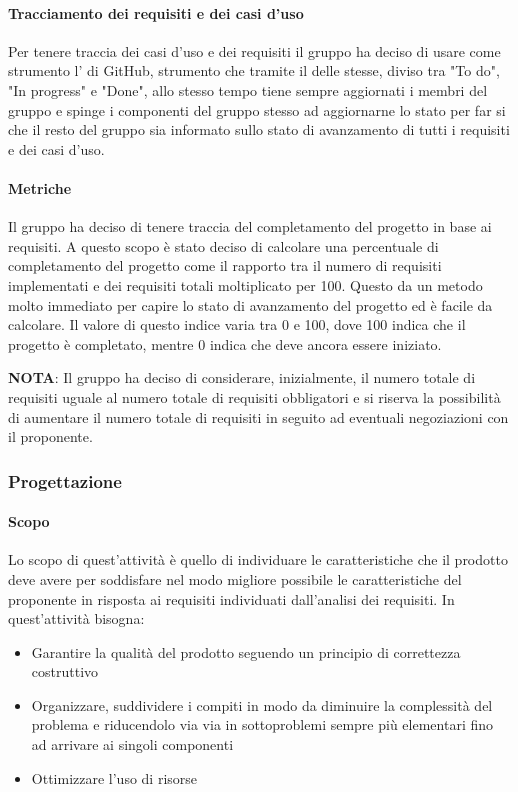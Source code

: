 \documentclass[../norme_di_progetto.tex]{subfiles}
\begin{document}
\paragraph{Tracciamento dei requisiti e dei casi d'uso}
Per tenere traccia dei casi d'uso e dei requisiti il gruppo ha deciso di usare come strumento l' di GitHub, strumento che tramite il  delle  stesse, diviso tra "To do", "In progress" e "Done", allo stesso tempo tiene sempre aggiornati i membri del gruppo e spinge i componenti del gruppo stesso ad aggiornarne lo stato per far si che il resto del gruppo sia informato sullo stato di avanzamento di tutti i requisiti e dei casi d'uso.

\paragraph{Metriche}
 Il gruppo ha deciso di tenere traccia del completamento del progetto in base ai requisiti. A questo scopo è stato deciso di calcolare una percentuale di completamento del progetto come il rapporto tra il numero di requisiti implementati e dei requisiti totali moltiplicato per 100. Questo da un metodo molto immediato per capire lo stato di avanzamento del progetto ed è facile da calcolare. Il valore di questo indice varia tra 0 e 100, dove 100 indica che il progetto è completato, mentre 0 indica che deve ancora essere iniziato. \par
 \textbf{NOTA}: Il gruppo ha deciso di considerare, inizialmente, il numero totale di requisiti uguale al numero totale di requisiti obbligatori e si riserva la possibilità di aumentare il numero totale di requisiti in seguito ad eventuali negoziazioni con il proponente.
 
\subsubsection{Progettazione}
 
    \paragraph{Scopo}
    Lo scopo di quest'attività è quello di individuare le caratteristiche che il prodotto deve avere per soddisfare nel modo migliore possibile le caratteristiche del proponente in risposta ai requisiti individuati dall'analisi dei requisiti. In quest'attività bisogna:
    \begin{itemize}
        \item Garantire la qualità del prodotto seguendo un principio di correttezza costruttivo
        \item Organizzare, suddividere i compiti in modo da diminuire la complessità del problema e riducendolo via via in sottoproblemi sempre più elementari fino ad arrivare ai singoli componenti
        \item Ottimizzare l'uso di risorse
    \end{itemize}
\end{document}
